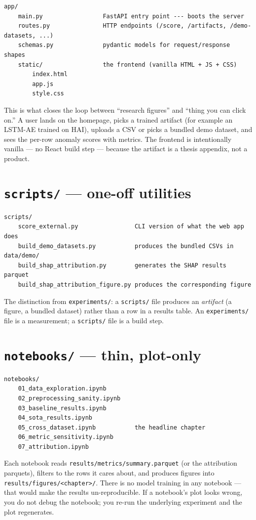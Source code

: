 \documentclass[11pt,a4paper]{article}
\newcommand{\code}[1]{\texttt{#1}}
\begin{document}
\begin{Verbatim}
app/
    main.py                 FastAPI entry point --- boots the server
    routes.py               HTTP endpoints (/score, /artifacts, /demo-datasets, ...)
    schemas.py              pydantic models for request/response shapes
    static/                 the frontend (vanilla HTML + JS + CSS)
        index.html
        app.js
        style.css
\end{Verbatim}

This is what closes the loop between ``research figures'' and ``thing you can click on.'' A user lands on the homepage, picks a trained artifact (for example an LSTM-AE trained on HAI), uploads a CSV or picks a bundled demo dataset, and sees the per-row anomaly scores with metrics. The frontend is intentionally vanilla --- no React build step --- because the artifact is a thesis appendix, not a product.

\section{\texttt{scripts/} --- one-off utilities}

\begin{Verbatim}
scripts/
    score_external.py                CLI version of what the web app does
    build_demo_datasets.py           produces the bundled CSVs in data/demo/
    build_shap_attribution.py        generates the SHAP results parquet
    build_shap_attribution_figure.py produces the corresponding figure
\end{Verbatim}

The distinction from \code{experiments/}: a \code{scripts/} file produces an \emph{artifact} (a figure, a bundled dataset) rather than a row in a results table. An \code{experiments/} file is a measurement; a \code{scripts/} file is a build step.

\section{\texttt{notebooks/} --- thin, plot-only}

\begin{Verbatim}
notebooks/
    01_data_exploration.ipynb
    02_preprocessing_sanity.ipynb
    03_baseline_results.ipynb
    04_sota_results.ipynb
    05_cross_dataset.ipynb           the headline chapter
    06_metric_sensitivity.ipynb
    07_attribution.ipynb
\end{Verbatim}

Each notebook reads \code{results/metrics/summary.parquet} (or the attribution parquets), filters to the rows it cares about, and produces figures into \code{results/figures/<chapter>/}. There is no model training in any notebook --- that would make the results un-reproducible. If a notebook's plot looks wrong, you do not debug the notebook; you re-run the underlying experiment and the plot regenerates.
\end{document}
